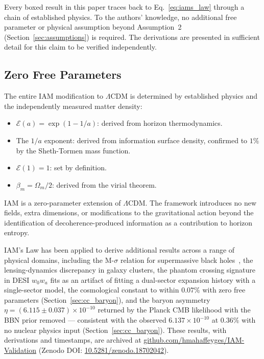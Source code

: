 \documentclass[12pt,a4paper]{article}
\begin{document}
Every boxed result in this paper traces back to
Eq.~\eqref{eq:iams_law} through a chain of established physics.
To the authors' knowledge, no additional free parameter or physical
assumption beyond Assumption~2 (Section~\ref{sec:assumptions}) is
required. The derivations are presented in sufficient detail for
this claim to be verified independently.

\subsection{Zero Free Parameters}

The entire IAM modification to $\Lambda$CDM is determined by
established physics and the independently measured matter density:
\begin{itemize}
\item $\mathcal{E}(a) = \exp(1-1/a)$: derived from horizon
  thermodynamics.
\item The $1/a$ exponent: derived from information surface density,
  confirmed to $1\%$ by the Sheth-Tormen mass function.
\item $\mathcal{E}(1) = 1$: set by definition.
\item $\beta_m = \Omega_m/2$: derived from the virial theorem.
\end{itemize}
IAM is a zero-parameter extension of $\Lambda$CDM. The framework
introduces no new fields, extra dimensions, or modifications to the
gravitational action beyond the identification of decoherence-produced
information as a contribution to horizon entropy.

IAM's Law has been applied to derive additional results across a range
of physical domains, including the M-$\sigma$ relation for
supermassive black holes~\citep{IAM_archive}, the lensing-dynamics
discrepancy in galaxy clusters, the phantom crossing signature in DESI
$w_0w_a$ fits as an artifact of fitting a dual-sector expansion history
with a single-sector model, the cosmological constant to within $0.07\%$
with zero free parameters (Section~\ref{sec:cc_baryon}), and the baryon
asymmetry $\eta = (6.115 \pm 0.037) \times 10^{-10}$ returned by the Planck
CMB likelihood with the BBN prior removed --- consistent with the
observed $6.137 \times 10^{-10}$ at $0.36\%$ with no nuclear physics
input (Section~\ref{sec:cc_baryon}). These results, with derivations
and timestamps, are archived at
\href{https://github.com/hmahaffeyges/IAM-Validation}{github.com/hmahaffeyges/IAM-Validation}
(Zenodo DOI:
\href{https://doi.org/10.5281/zenodo.18702042}{10.5281/zenodo.18702042}).
\end{document}

